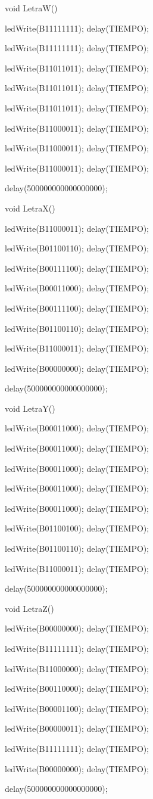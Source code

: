 \documentclass{article}
\begin{document}
void LetraW(){

   ledWrite(B11111111); delay(TIEMPO);

   ledWrite(B11111111); delay(TIEMPO);

   ledWrite(B11011011); delay(TIEMPO);

   ledWrite(B11011011); delay(TIEMPO);

   ledWrite(B11011011); delay(TIEMPO);

   ledWrite(B11000011); delay(TIEMPO);

   ledWrite(B11000011); delay(TIEMPO);

   ledWrite(B11000011); delay(TIEMPO);

  delay(500000000000000000);}

void LetraX(){

   ledWrite(B11000011); delay(TIEMPO);

   ledWrite(B01100110); delay(TIEMPO);

   ledWrite(B00111100); delay(TIEMPO);

   ledWrite(B00011000); delay(TIEMPO);


   ledWrite(B00111100); delay(TIEMPO);

   ledWrite(B01100110); delay(TIEMPO);

   ledWrite(B11000011); delay(TIEMPO);

   ledWrite(B00000000); delay(TIEMPO);

  delay(500000000000000000);}

void LetraY(){

   ledWrite(B00011000); delay(TIEMPO);

   ledWrite(B00011000); delay(TIEMPO);

   ledWrite(B00011000); delay(TIEMPO);

   ledWrite(B00011000); delay(TIEMPO);

   ledWrite(B00011000); delay(TIEMPO);

   ledWrite(B01100100); delay(TIEMPO);

   ledWrite(B01100110); delay(TIEMPO);

   ledWrite(B11000011); delay(TIEMPO);

  delay(500000000000000000);}

void LetraZ(){

   ledWrite(B00000000); delay(TIEMPO);

   ledWrite(B11111111); delay(TIEMPO);

   ledWrite(B11000000); delay(TIEMPO);

   ledWrite(B00110000); delay(TIEMPO);

   ledWrite(B00001100); delay(TIEMPO);

   ledWrite(B00000011); delay(TIEMPO);

   ledWrite(B11111111); delay(TIEMPO);

   ledWrite(B00000000); delay(TIEMPO);

  delay(500000000000000000);}
\end{document}
